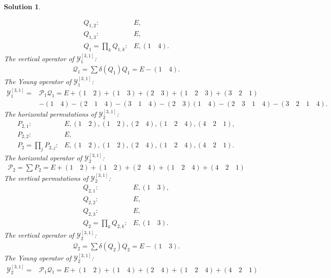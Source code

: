 \documentclass[UTF8,10pt,a4paper]{article}
\theoremstyle{Problem}
\theoremstyle{Solution}
\newtheorem*{sol}{Solution}
\begin{document}
\begin{sol}
\begin{enumerate}
\begin{align}
            Q_{1,2}:&E,\\
            Q_{1,3}:&E,\\
            Q_1=\prod_kQ_{1,k}:&E,(1\quad 4).
        \end{align}
        The vertical operator of $\mathcal{Y}_1^{[3,1]}$:
        \begin{align}
            \mathcal{Q}_1=\sum\delta(Q_1)Q_1=E-(1\quad 4).
        \end{align}
        The Young operator of $\mathcal{Y}_1^{[3,1]}$:
        \begin{align}
            \nonumber\mathcal{Y}_1^{[3,1]}=&\mathcal{P}_1\mathcal{Q}_1=E+(1\quad 2)+(1\quad 3)+(2\quad 3)+(1\quad 2\quad 3)+(3\quad 2\quad 1)\\
            &-(1\quad 4)-(2\quad 1\quad 4)-(3\quad 1\quad 4)-(2\quad 3)(1\quad 4)-(2\quad 3\quad 1\quad 4)-(3\quad 2\quad 1\quad 4).
        \end{align}
        The horizontal permutations of $\mathcal{Y}_2^{[3,1]}$:
        \begin{align}
            P_{2,1}:&E,(1\quad 2),(1\quad 2),(2\quad 4),(1\quad 2\quad 4),(4\quad 2\quad 1),\\
            P_{2,2}:&E,\\
            P_2=\prod_jP_{2,j}:&E,(1\quad 2),(1\quad 2),(2\quad 4),(1\quad 2\quad 4),(4\quad 2\quad 1).
        \end{align}
        The horizontal operator of $\mathcal{Y}_2^{[3,1]}$:
        \begin{align}
            \mathcal{P}_2=\sum P_2=E+(1\quad 2)+(1\quad 2)+(2\quad 4)+(1\quad 2\quad 4)+(4\quad 2\quad 1)
        \end{align}
        The vertical permutations of $\mathcal{Y}_2^{[3,1]}$:
        \begin{align}
            Q_{2,1}:&E,(1\quad 3),\\
            Q_{2,2}:&E,\\
            Q_{2,3}:&E,\\
            Q_2=\prod_kQ_{2,k}:&E,(1\quad 3).
        \end{align}
        The vertical operator of $\mathcal{Y}_2^{[3,1]}$:
        \begin{align}
            \mathcal{Q}_2=\sum\delta(Q_2)Q_2=E-(1\quad 3).
        \end{align}
        The Young operator of $\mathcal{Y}_2^{[3,1]}$:
        \begin{align}
            \nonumber\mathcal{Y}_2^{[3,1]}=&\mathcal{P}_1\mathcal{Q}_1=E+(1\quad 2)+(1\quad 4)+(2\quad 4)+(1\quad 2\quad 4)+(4\quad 2\quad 1)\\

\end{align}
\end{enumerate}
\end{sol}
\end{document}
